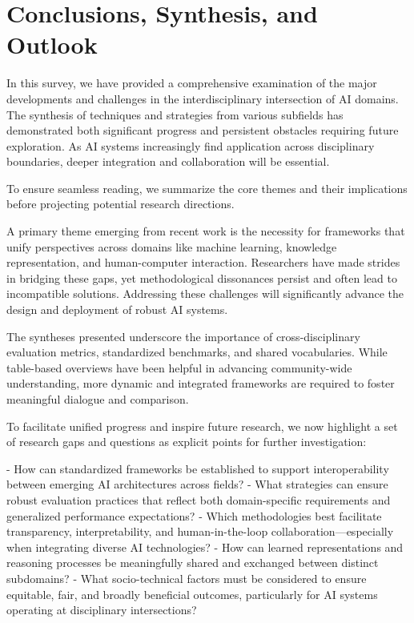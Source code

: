\documentclass[sigconf]{acmart}
\begin{document}
\section{Conclusions, Synthesis, and Outlook}

In this survey, we have provided a comprehensive examination of the major developments and challenges in the interdisciplinary intersection of AI domains. The synthesis of techniques and strategies from various subfields has demonstrated both significant progress and persistent obstacles requiring future exploration. As AI systems increasingly find application across disciplinary boundaries, deeper integration and collaboration will be essential.

To ensure seamless reading, we summarize the core themes and their implications before projecting potential research directions.

A primary theme emerging from recent work is the necessity for frameworks that unify perspectives across domains like machine learning, knowledge representation, and human-computer interaction. Researchers have made strides in bridging these gaps, yet methodological dissonances persist and often lead to incompatible solutions. Addressing these challenges will significantly advance the design and deployment of robust AI systems.

The syntheses presented underscore the importance of cross-disciplinary evaluation metrics, standardized benchmarks, and shared vocabularies. While table-based overviews have been helpful in advancing community-wide understanding, more dynamic and integrated frameworks are required to foster meaningful dialogue and comparison.

To facilitate unified progress and inspire future research, we now highlight a set of research gaps and questions as explicit points for further investigation:

- How can standardized frameworks be established to support interoperability between emerging AI architectures across fields?
- What strategies can ensure robust evaluation practices that reflect both domain-specific requirements and generalized performance expectations?
- Which methodologies best facilitate transparency, interpretability, and human-in-the-loop collaboration—especially when integrating diverse AI technologies?
- How can learned representations and reasoning processes be meaningfully shared and exchanged between distinct subdomains?
- What socio-technical factors must be considered to ensure equitable, fair, and broadly beneficial outcomes, particularly for AI systems operating at disciplinary intersections?
\end{document}

